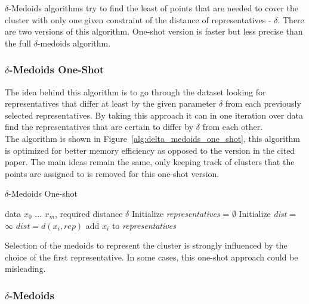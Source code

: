 \documentclass[thesis=B,english]{FITthesis}[2012/10/20]
\begin{document}
$\delta$-Medoids algorithms try to find the least of points that are needed to cover the cluster with only one given constraint of the distance of representatives - $\delta$.
There are two versions of this algorithm.
One-shot version is faster but less precise than the full $\delta$-medoids algorithm.

\subsubsection{$\delta$-Medoids One-Shot}

The idea behind this algorithm is to go through the dataset looking for representatives that differ at least by the given parameter $\delta$ from each previously selected representatives.
By taking this approach it can in one iteration over data find the representatives that are certain to differ by $\delta$ from each other. \\

The algorithm is shown in Figure~\ref{alg:delta_medoids_one_shot}, this algorithm is optimized for better memory efficiency as opposed to the version in the cited paper.
The main ideas remain the same, only keeping track of clusters that the points are assigned to is removed for this one-shot version.

\begin{algorithm}
    \caption{$\delta$-Medoids One-shot}
    \label{delta_medoids_one_shot}
    \begin{algorithmic}[1]
        \INPUT data $x_0$ ... $x_m$, required distance $\delta$
        \STATE Initialize \textit{representatives} = $\emptyset$
            \STATE Initialize \textit{dist} = $\infty$
                    \STATE $dist = d(x_i, rep)$
                \ENDIF
            \ENDFOR
                \STATE add $x_i$ to \textit{representatives}
            \ENDIF
        \ENDFOR
    \end{algorithmic}
\end{algorithm}


Selection of the medoids to represent the cluster is strongly influenced by the choice of the first representative.
In some cases, this one-shot approach could be misleading.

\subsubsection{$\delta$-Medoids}
\end{document}
